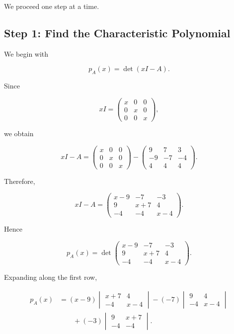 \documentclass[11pt]{article}
\begin{document}
We proceed one step at a time.


\subsection{Step 1: Find the Characteristic Polynomial}

We begin with

\[
p_A(x)=\det(xI-A).
\]

Since

\[
xI=
\begin{pmatrix}
x&0&0\\
0&x&0\\
0&0&x
\end{pmatrix},
\]

we obtain

\[
xI-A
=
\begin{pmatrix}
x&0&0\\
0&x&0\\
0&0&x
\end{pmatrix}
-
\begin{pmatrix}
9&7&3\\
-9&-7&-4\\
4&4&4
\end{pmatrix}.
\]

Therefore,

\[
xI-A
=
\begin{pmatrix}
x-9&-7&-3\\
9&x+7&4\\
-4&-4&x-4
\end{pmatrix}.
\]

Hence

\[
p_A(x)
=
\det
\begin{pmatrix}
x-9&-7&-3\\
9&x+7&4\\
-4&-4&x-4
\end{pmatrix}.
\]

Expanding along the first row,

\[
\begin{aligned}
p_A(x)
&=
(x-9)
\begin{vmatrix}
x+7&4\\
-4&x-4
\end{vmatrix}
-
(-7)
\begin{vmatrix}
9&4\\
-4&x-4
\end{vmatrix} \\
&\qquad
+
(-3)
\begin{vmatrix}
9&x+7\\
-4&-4
\end{vmatrix}.
\end{aligned}
\]
\end{document}
